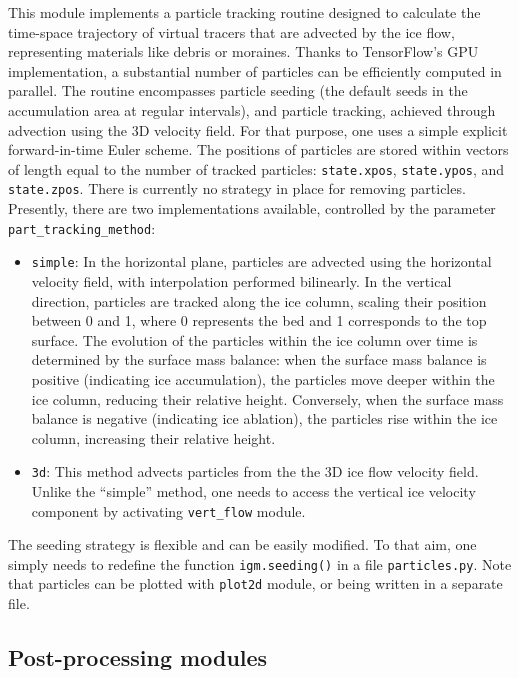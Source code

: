 \documentclass[10pt,twocolumn]{article}
\begin{document}
This module implements a particle tracking routine designed to calculate the time-space 
trajectory of virtual tracers that are advected by the ice flow, representing materials 
like debris or moraines. Thanks to TensorFlow's GPU implementation, a substantial number 
of particles can be efficiently computed in parallel. The routine encompasses particle seeding
(the default seeds in the accumulation area at regular intervals), and particle tracking, 
achieved through advection using the 3D velocity field. 
For that purpose, one uses a simple explicit forward-in-time Euler scheme. 
The positions of particles are stored within vectors of length equal to the number of tracked 
particles: \texttt{state.xpos}, \texttt{state.ypos}, and \texttt{state.zpos}.
There is currently no strategy in place for removing particles. 
Presently, there are two implementations available, controlled 
by the parameter \texttt{part\_tracking\_method}:
\begin{itemize}
\item \texttt{simple}: 
In the horizontal plane, particles are advected using the horizontal velocity field, 
with interpolation performed bilinearly.
In the vertical direction, particles are tracked along the ice column, scaling their 
position between 0 and 1, where 0 represents the bed and 1 corresponds to the top surface. 
The evolution of the particles within the ice column over time is determined by the surface 
mass balance: when the surface mass balance is positive (indicating ice accumulation), 
the particles move deeper within the ice column, reducing their relative height. 
Conversely, when the surface mass balance is negative (indicating ice ablation), 
the particles rise within the ice column, increasing their relative height.
\item \texttt{3d}: This method advects particles from the the 3D ice flow velocity field. 
Unlike the ``simple'' method, one needs to access the vertical ice velocity component
by activating \texttt{vert\_flow} module.
\end{itemize}
The seeding strategy is flexible and can be easily modified. To that aim, 
one simply needs to redefine the function \texttt{igm.seeding()} in a file \texttt{particles.py}.
Note that particles can be plotted with \texttt{plot2d} module, or being written 
in a separate file.

\subsection{Post-processing modules}
\end{document}
